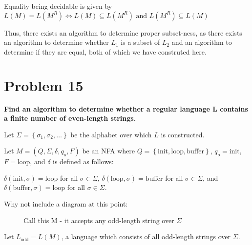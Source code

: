 \documentclass{report}
\begin{document}
Equality being decidable is given by  $L(M) = L(M^R) \iff L(M) \subseteq L(M^R) \text{ and } L(M^R) \subseteq L(M)$

Thus, there exists an algorithm to determine proper subset-ness, as there exists an algorithm to determine whether $L_1$ is a subset of $L_2$ and an algorithm to determine if they are equal, both of which we have construted here.

\section*{Problem 15}
\textbf{Find an algorithm to determine whether a regular language L contains a finite number of even-length strings.}

Let $\Sigma = \left\{ \sigma_1, \sigma_2, \dots \right\}$ be the alphabet over which $L$ is constructed. 

Let $M = \left(Q, \Sigma, \delta, q_o, F \right)$  be an NFA
where $Q = \left\{ \text{init}, \text{loop}, \text{buffer} \right\}$, $q_o = \text{init}$, $F = \text{loop}$, and $\delta$ is defined as follows:

$\delta(\text{init}, \sigma) = \text{loop}$ for all $\sigma \in \Sigma$, $\delta(\text{loop}, \sigma) = \text{buffer}$ for all $\sigma \in \Sigma$,
and $\delta(\text{buffer}, \sigma) = \text{loop}$ for all $\sigma \in \Sigma$.

Why not include a diagram at this point:

\begin{figure}[H] %
        \centering %
        \caption*{Call this M - it accepts any odd-length string over $\Sigma$}
        \label{fig:p3}
    \end{figure}

Let $L_\text{odd} = L(M)$, a language which consists of all odd-length strings over $\Sigma$.
\end{document}
